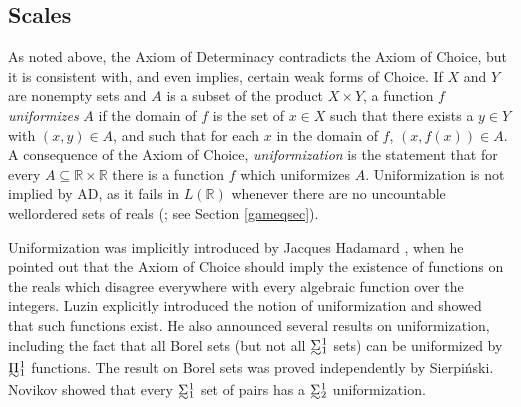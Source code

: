 \documentclass{book}%
\def\underTilde#1{{\baselineskip=0pt\vtop{\hbox{$#1$}\hbox{$\sim$}}}{}}
\newcommand{\uTSigma}{\underTilde{\Sigma}}
\begin{document}



\subsection{Scales}\label{scalesec}


As noted above, the Axiom of Determinacy contradicts the Axiom of Choice, but it
is consistent with, and even implies, certain weak forms of Choice. If $X$ and $Y$ are
nonempty sets and
$A$ is a subset of the product $X \times Y$, a function $f$
\emph{uniformizes} $A$ if the domain of $f$ is the set of $x \in X$ such
that there exists a $y \in Y$ with $(x,y) \in A$, and such that for each
$x$ in the domain of $f$, $(x,f(x)) \in A$. A consequence of the Axiom of Choice, \emph{uniformization} is the statement
that for every $A \subseteq \mathbb{R} \times \mathbb{R}$ there is a function $f$ which uniformizes $A$.
Uniformization is not implied by AD, as it
fails in $L(\mathbb{R})$ whenever there are no uncountable wellordered sets of reals  (\cite{Solovay:1978DCAD};
see Section \ref{gameqsec}).

Uniformization was implicitly introduced by Jacques Hadamard , when he pointed out that the Axiom of Choice should imply the
existence of functions on the reals which disagree everywhere with
every algebraic function over the integers. Luzin 
explicitly introduced the notion of uniformization and showed that such functions
exist. He also announced several results on uniformization, including the
fact that all Borel sets (but not all $\underTilde{\Sigma}^{1}_{1}$ sets)
can be uniformized by $\underTilde{\Pi}^{1}_{1}$ functions. The result on
Borel sets was proved independently by Sierpi\'{n}ski.
Novikov 
showed that every $\uTSigma^{1}_{1}$ set of pairs has a
$\uTSigma^{1}_{2}$ uniformization.

\end{document}
